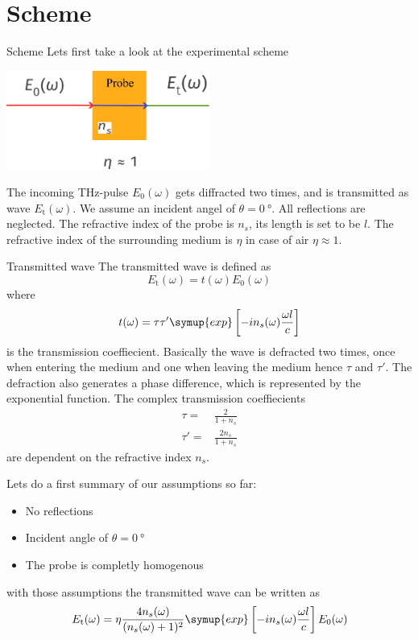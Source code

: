 \documentclass[aspectratio=1610, 9pt]{beamer}
\begin{document}
\section{Scheme}
\begin{frame}{Scheme}
  Lets first take a look at the experimental scheme
  \begin{center}
  \includegraphics[width=0.5\textwidth]{images/Transmission.pdf}
  \end{center}
  The incoming THz-pulse $E_0(\omega)$ gets diffracted two times, and is transmitted as wave $E_\text{t}(\omega)$.
  We assume an incident angel of $\theta=\SI{0}{\degree}$.
  All reflections are neglected.
  The refractive index of the probe is $n_s$, its length is set to be $l$.
  The refractive index of the surrounding medium is $\eta$ in case of air $\eta\approx 1$.
\end{frame}

\begin{frame}{Transmitted wave}
  The transmitted wave is defined as 
  \begin{equation}
    E_\text{t}(\omega) = t(\omega) E_0(\omega)
  \end{equation}
  where
  \begin{equation}
    t(\omega) = \tau \tau' \symup{exp}\left[- i n_s(\omega) \frac{\omega l }{c}\right]
  \end{equation}
  is the transmission coeffiecient.
  Basically the wave is defracted two times, once when entering the medium and one when leaving the medium hence $\tau$ and $\tau'$.
  The defraction also generates a phase difference, which is represented by the exponential function.
  The complex transmission coeffiecients 
  \begin{align}
    \tau = & \frac{2}{1 + n_s} \\
    \tau' = &  \frac{2 n_s}{1+ n_s} 
  \end{align}
  are dependent on the refractive index $n_s$.
\end{frame}

\begin{frame}
  Lets do a first summary of our assumptions so far:
  \begin{itemize}
    \item No reflections
    \item Incident angle of $\theta=\SI{0}{\degree}$
    \item The probe is completly homogenous
  \end{itemize}
  with those assumptions the transmitted wave can be written as 
  \begin{equation}
    E_\text{t}(\omega) = \eta\frac{4 n_s (\omega)}{(n_s(\omega) + 1)^2} \symup{exp}\left[ -i n_s (\omega) \frac{\omega l }{c}\right] E_0(\omega)
  \end{equation}
\end{frame}
\end{document}
